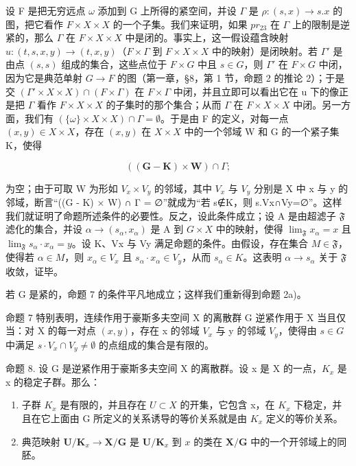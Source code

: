 设 F 是把无穷远点 \(\omega\) 添加到 G 上所得的紧空间，并设 \(\Gamma\) 是 \(\rho: (s, x) \to s.x\) 的图，把它看作 \(F \times X \times X\) 的一个子集。我们来证明，如果 \(pr_{23}\) 在 \(\Gamma\) 上的限制是逆紧的，那么 \(\Gamma\) 在 \(F \times X \times X\) 中是闭的。事实上，这一假设蕴含映射 \(u: (t, s, x, y) \to (t, x, y)\)（\(F \times \Gamma\) 到 \(F \times X \times X\) 中的映射）是闭映射。若 \(\Gamma'\) 是由点 \((s, s)\) 组成的集合，这些点位于 \(F \times G\) 中且 \(s \in G\)，则 \(\Gamma'\) 在 \(F \times G\) 中闭，因为它是典范单射 \(G \to F\) 的图（第一章，§8，第 1 节，命题 2 的推论 2）；于是交 \((\Gamma' \times X \times X) \cap (F \times \Gamma)\) 在 \(F \times \Gamma\) 中闭，并且立即可以看出它在 u 下的像正是把 \(\Gamma\) 看作 \(F \times X \times X\) 的子集时的那个集合；从而 \(\Gamma\) 在 \(F \times X \times X\) 中闭。另一方面，我们有 \((\{\omega\} \times X \times X) \cap \Gamma = \emptyset\)。于是由 F 的定义，对每一点 \((x, y) \in X \times X\)，存在 \((x, y)\) 在 \(X \times X\) 中的一个邻域 W 和 G 的一个紧子集 K，使得

\[
((\mathbf {G} - \mathbf {K}) \times \mathbf {W}) \cap \Gamma ;
\]

为空；由于可取 W 为形如 \(V_{x} \times V_{y}\) 的邻域，其中 \(V_{x}\) 与 \(V_{y}\) 分别是 X 中 x 与 y 的邻域，断言“((G - K) × W) ∩ Γ = ∅”就成为“若 s∉K，则 s.Vx∩Vy=∅”。这样我们就证明了命题所述条件的必要性。反之，设此条件成立；设 A 是由超滤子 \(\mathfrak{F}\) 滤化的集合，并设 \(\alpha \to (s_{\alpha}, x_{\alpha})\) 是 A 到 \(G \times X\) 中的映射，使得 \(\lim_{\mathfrak{F}} x_{\alpha} = x\) 且 \(\lim_{\mathfrak{F}} s_{\alpha}\cdot x_{\alpha} = y\)。设 K、Vx 与 Vy 满足命题的条件。由假设，存在集合 \(M \in \mathfrak{F}\)，使得若 \(\alpha \in M\)，则 \(x_{\alpha} \in V_{x}\) 且 \(s_{\alpha}\cdot x_{\alpha} \in V_{y}\)，从而 \(s_{\alpha} \in K\)。这表明 \(\alpha \to s_{\alpha}\) 关于 \(\mathfrak{F}\) 收敛，证毕。

若 G 是紧的，命题 7 的条件平凡地成立；这样我们重新得到命题 2a)。

命题 7 特别表明，连续作用于豪斯多夫空间 X 的离散群 G 逆紧作用于 X 当且仅当：对 X 的每一对点 \((x, y)\)，存在 x 的邻域 \(V_{x}\) 与 y 的邻域 \(V_{y}\)，使得由 \(s \in G\) 中满足 \(s \cdot V_{x} \cap V_{y} \neq \emptyset\) 的点组成的集合是有限的。

命题 8. 设 G 是逆紧作用于豪斯多夫空间 X 的离散群。设 x 是 X 的一点，\(K_{x}\) 是 x 的稳定子群。那么：

\begin{enumerate}
\def\labelenumi{\alph{enumi})}
\item
  子群 \(K_{x}\) 是有限的，并且存在 \(U \subset X\) 的开集，它包含 x，在 \(K_{x}\) 下稳定，并且在它上面由 G 所定义的关系诱导的等价关系就是由 \(K_{x}\) 定义的等价关系。
\item
  典范映射 \(\mathbf{U} / \mathbf{K}_x\to \mathbf{X} / \mathbf{G}\) 是 \(\mathbf{U} / \mathbf{K}_x\) 到 \(x\) 的类在 \(\mathbf{X} / \mathbf{G}\) 中的一个开邻域上的同胚。
\end{enumerate}

